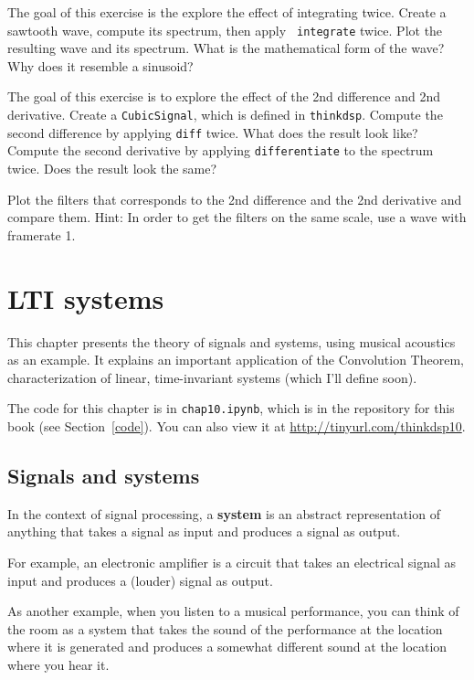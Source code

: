 \documentclass[12pt]{book}
\begin{document}
\begin{exercise}
The goal of this exercise is the explore the effect of integrating
twice. Create a sawtooth wave, compute its spectrum, then apply {\tt
  integrate} twice. Plot the resulting wave and its spectrum. What is
the mathematical form of the wave? Why does it resemble a sinusoid?
\end{exercise}

\begin{exercise}
The goal of this exercise is to explore the effect of the 2nd
difference and 2nd derivative. Create a {\tt CubicSignal}, which is
defined in {\tt thinkdsp}. Compute the second difference by applying
{\tt diff} twice. What does the result look like?  Compute the second
derivative by applying {\tt differentiate} to the spectrum twice.
Does the result look the same?

Plot the filters that corresponds to the 2nd difference and the 2nd
derivative and compare them. Hint: In order to get the filters on the
same scale, use a wave with framerate 1.
\end{exercise}




\chapter{LTI systems}
\label{systems}

This chapter presents the theory of signals and systems, using
musical acoustics as an example.  It explains an
important application of the Convolution Theorem, characterization
of linear, time-invariant systems (which I'll define soon).

The code for this chapter is in {\tt chap10.ipynb}, which is in the
repository for this book (see Section~\ref{code}).
You can also view it at \url{http://tinyurl.com/thinkdsp10}.



\section{Signals and systems}

In the context of signal processing, a {\bf system} is an abstract
representation of anything that takes a signal as input and produces
a signal as output.

For example, an electronic amplifier is a circuit that takes an
electrical signal as input and produces a (louder) signal as output.

As another example, when you listen to a musical performance, you
can think of the room as a system that takes the sound of the
performance at the location where it is generated and produces a
somewhat different sound at the location where you hear it.
\end{document}
